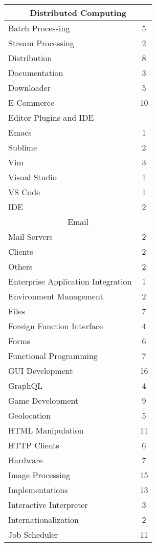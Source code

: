 \begin{longtable} {|l|c|}
    \multicolumn{2}{|c|}{Distributed Computing}\\
    \hline
    Batch Processing & 5\\
    Stream Processing & 2\\
    \hline
    Distribution & 8\\
    \hline
    Documentation & 3\\
    \hline
    Downloader & 5\\
    \hline
    E-Commerce & 10\\
    \hline
    Editor Plugins and IDE & \\
    \hline
    Emacs & 1\\
    Sublime & 2\\
    Vim & 3\\
    Visual Studio & 1\\
    VS Code & 1\\
    IDE & 2\\
    \hline
    \multicolumn{2}{|c|}{Email}\\
    \hline
    Mail Servers & 2\\
    Clients & 2\\
    Others & 2\\
    \hline
    Enterprise Application Integration & 1\\
    \hline
    Environment Management & 2\\
    \hline
    Files & 7\\
    \hline
    Foreign Function Interface & 4\\
    \hline
    Forms & 6\\
    \hline
    Functional Programming & 7\\
    \hline
    GUI Development & 16\\
    \hline
    GraphQL & 4\\
    \hline
    Game Development & 9\\
    \hline
    Geolocation & 5\\
    \hline
    HTML Manipulation & 11\\
    \hline
    HTTP Clients & 6\\
    \hline
    Hardware & 7\\
    \hline
    Image Processing & 15\\
    \hline
    Implementations & 13\\
    \hline
    Interactive Interpreter & 3\\
    \hline
    Internationalization & 2\\
    \hline
    Job Scheduler & 11\\

\end{longtable}
